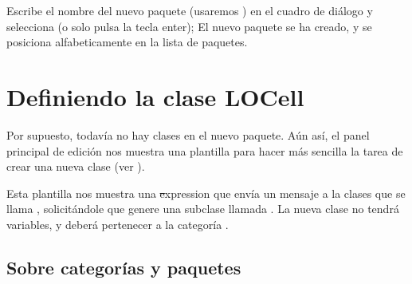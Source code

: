 \documentclass[a4paper,10pt,twoside]{book}
\begin{document}

Escribe el nombre del nuevo paquete (usaremos ) en
el cuadro de di\'alogo y selecciona  (o solo pulsa
la tecla enter); El nuevo paquete se ha creado, y se posiciona alfabeticamente
en la lista de paquetes.

\section{Definiendo la clase LOCell}


Por supuesto, todav\'ia no hay clases en el nuevo paquete. A\'un as\'i, el panel
principal de edici\'on nos muestra una plantilla para hacer m\'as sencilla la tarea de crear
una nueva clase (ver ).




Esta plantilla nos muestra una \st expression que env\'ia un mensaje a la clases
que se llama , solicit\'andole que genere una subclase llamada
. La nueva clase no tendr\'a variables, y deber\'a pertenecer
a la categor\'ia .

\subsection{Sobre categor\'ias y paquetes}
\end{document}
